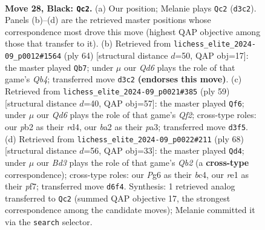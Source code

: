 \documentclass[11pt]{article}
\begin{document}
\clearpage

\begin{figure}[p]\centering
\begin{subfigure}{0.46\textwidth}\centering
\resizebox{\linewidth}{!}{%
\newchessgame
\chessboard[
  setfen={8/pp5p/3b2pk/8/8/P2q2P1/BP3P1P/4R1K1 b - - 2 28},
  showmover=false,
  pgfstyle=straightmove, color=movearrow, markmove={d3-c2}
]}
\caption{}
\end{subfigure}\hfill
\begin{subfigure}{0.46\textwidth}\centering
\resizebox{\linewidth}{!}{%
\newchessgame
\chessboard[
  setfen={r6k/6p1/2p1p2p/4P2P/1Q3B2/p5P1/b4P2/6K1 w - - 1 33},
  showmover=false,
  pgfstyle=straightmove, color=movearrow, markmove={b4-b7}
]}
\caption{}
\end{subfigure}
\\[4pt]
\begin{subfigure}{0.46\textwidth}\centering
\resizebox{\linewidth}{!}{%
\newchessgame
\chessboard[
  setfen={6k1/1p3qp1/p1b4p/8/2PR4/P4P2/1P4PP/4Q1K1 b - - 0 30},
  showmover=false,
  pgfstyle=straightmove, color=movearrow, markmove={f7-f6}
]}
\caption{}
\end{subfigure}\hfill
\begin{subfigure}{0.46\textwidth}\centering
\resizebox{\linewidth}{!}{%
\newchessgame
\chessboard[
  setfen={5k2/ppp2pp1/3p3p/5P2/2b4q/4B3/1QPK1P2/8 w - - 0 35},
  showmover=false,
  pgfstyle=straightmove, color=movearrow, markmove={b2-d4}
]}
\caption{}
\end{subfigure}
\caption{\textbf{Move 28, Black: \texttt{Qc2}.} (a) Our position; Melanie plays \texttt{Qc2} (\texttt{d3c2}). Panels (b)--(d) are the retrieved master positions whose correspondence most drove this move (highest QAP objective among those that transfer to it). (b) Retrieved from \texttt{lichess\_elite\_2024-09\_p0012\#1564} (ply 64) [structural distance $d$=50, QAP obj=17]: the master played \texttt{Qb7}; under $\mu$ our \emph{Qd6} plays the role of that game's \emph{Qb4}; transferred move \texttt{d3c2} \textbf{(endorses this move)}. (c) Retrieved from \texttt{lichess\_elite\_2024-09\_p0021\#385} (ply 59) [structural distance $d$=40, QAP obj=57]: the master played \texttt{Qf6}; under $\mu$ our \emph{Qd6} plays the role of that game's \emph{Qf2}; cross-type roles: our \emph{p}b2 as their \emph{r}d4, our \emph{b}a2 as their \emph{p}a3; transferred move \texttt{d3f5}. (d) Retrieved from \texttt{lichess\_elite\_2024-09\_p0022\#211} (ply 68) [structural distance $d$=56, QAP obj=33]: the master played \texttt{Qd4}; under $\mu$ our \emph{Bd3} plays the role of that game's \emph{Qb2} (a \textbf{cross-type} correspondence); cross-type roles: our \emph{P}g6 as their \emph{b}c4, our \emph{r}e1 as their \emph{p}f7; transferred move \texttt{d6f4}. Synthesis: 1 retrieved analog transferred to \texttt{Qc2} (summed QAP objective 17, the strongest correspondence among the candidate moves); Melanie committed it via the \texttt{search} selector.}
\label{fig:thought-m55}
\end{figure}
\end{document}
